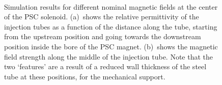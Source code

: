 \begin{refsection}
        \begin{figure}
            \centering
            \\
            \caption[muEDM 2023: injection shielding]{Simulation results for different nominal magnetic fields at the center of the PSC solenoid. (a)~shows the relative permittivity of the injection tubes as a function of the distance along the tube, starting from the upstream position and going towards the downstream position inside the bore of the PSC magnet. (b)~shows the magnetic field strength along the middle of the injection tube. Note that the two `features' are a result of a reduced wall thickness of the steel tube at these positions, for the mechanical support.}
            \label{fig:TB2023FieldStrengthTubes}
        \end{figure}	
        \begin{figure}
            \centering
            \\

\end{figure}
\end{refsection}
